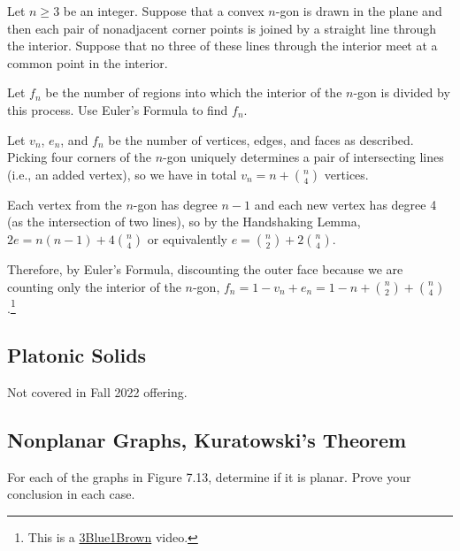 \begin{xca}
  Let $n \geq 3$ be an integer.
  Suppose that a convex $n$-gon is drawn in the plane
  and then each pair of nonadjacent corner points
  is joined by a straight line through the interior.
  Suppose that no three of these lines through the interior
  meet at a common point in the interior.

  Let $f_n$ be the number of regions into which
  the interior of the $n$-gon is divided by this process.
  Use Euler's Formula to find $f_n$.
\end{xca}
\begin{sol}
  Let $v_n$, $e_n$, and $f_n$ be the number of vertices, edges, and faces as described.
  Picking four corners of the $n$-gon uniquely determines
  a pair of intersecting lines (i.e., an added vertex),
  so we have in total $v_n = n + \binom{n}{4}$ vertices.

  Each vertex from the $n$-gon has degree $n-1$
  and each new vertex has degree 4 (as the intersection of two lines),
  so by the Handshaking Lemma, $2e = n(n-1) + 4\binom{n}{4}$
  or equivalently $e = \binom{n}{2} + 2\binom{n}{4}$.

  Therefore, by Euler's Formula, discounting the outer face because
  we are counting only the interior of the $n$-gon, $f_n = 1 - v_n + e_n
    = 1 - n + \binom{n}{2} + \binom{n}{4}$.\footnote{This is a \href{https://www.youtube.com/watch?v=K8P8uFahAgc}{3Blue1Brown} video.}
\end{sol}

\subsection{Platonic Solids}

Not covered in Fall 2022 offering.

\setcounter{subsection}{5}
\subsection{Nonplanar Graphs, Kuratowski's Theorem}

\begin{xca}
  For each of the graphs in Figure 7.13, determine if it is planar.
  Prove your conclusion in each case.
\end{xca}

